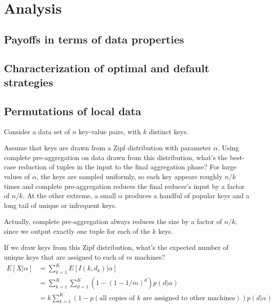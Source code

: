 \documentclass[12pt]{article}
\begin{document}
\pagebreak
\section{Analysis}

\subsection{Payoffs in terms of data properties}

\subsection{Characterization of optimal and default strategies}

\subsection{Permutations of local data}

Consider a data set of $n$ key-value pairs, with $k$ distinct keys.

Assume that keys are drawn from a Zipf distribution with parameter $\alpha$.
Using complete pre-aggregation on data drawn from this distribution, what's the best-case reduction of tuples in the input to the final aggregation phase?
For large values of $\alpha$, the keys are sampled uniformly, so each key appears roughly $n/k$ times and complete pre-aggregation reduces the final reducer's input by a factor of $n/k$.
At the other extreme, a small $\alpha$ produces a handful of popular keys and a long tail of unique or infrequent keys.

Actually, complete pre-aggregation always reduces the size by a factor of $n/k$, since we output exactly one tuple for each of the $k$ keys.


If we draw keys from this Zipf distribution, what's the expected number of unique keys that are assigned to each of $m$ machines?
\begin{align*}
    E[X|\alpha] &= \sum_{k=1}^K E[I(k, d_k) | \alpha]
\\              &= \sum_{k=1}^K \sum_{d=1}^K \left(1 - \left(1 - 1/m\right)^d\right)p(d | \alpha)
\\              &= k \sum_{k=1}^K\left(1 - p\left(\text{all copies of $k$ are assigned to other machines}\right)\right) p(d | \alpha)
\end{align*}
\end{document}
